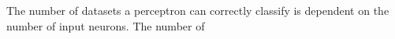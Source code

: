 The number of datasets a perceptron can correctly classify is dependent on the number of input neurons. The number of 